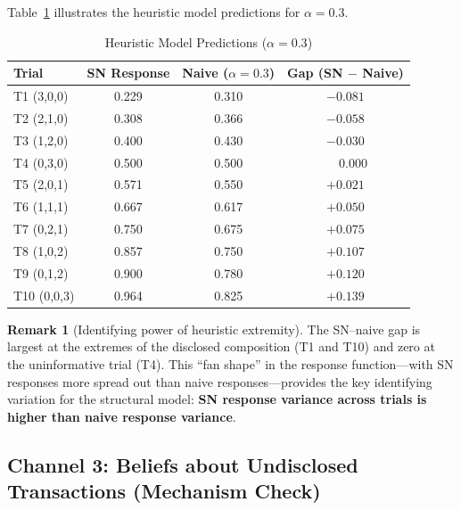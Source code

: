 \documentclass[12pt]{article}
\theoremstyle{definition}
\newtheorem{remark}{Remark}
\begin{document}
Table~\ref{tab:heuristic} illustrates the heuristic model predictions for $\alpha = 0.3$.

\begin{table}[h!]
\centering
\caption{Heuristic Model Predictions ($\alpha = 0.3$)}
\label{tab:heuristic}
\begin{tabular}{l cc c}
\toprule
Trial & SN Response & Naive ($\alpha = 0.3$) & Gap (SN $-$ Naive) \\
\midrule
T1 (3,0,0)   & 0.229 & 0.310 & $-0.081$ \\
T2 (2,1,0)   & 0.308 & 0.366 & $-0.058$ \\
T3 (1,2,0)   & 0.400 & 0.430 & $-0.030$ \\
T4 (0,3,0)   & 0.500 & 0.500 & $\phantom{-}0.000$ \\
T5 (2,0,1)   & 0.571 & 0.550 & $+0.021$ \\
T6 (1,1,1)   & 0.667 & 0.617 & $+0.050$ \\
T7 (0,2,1)   & 0.750 & 0.675 & $+0.075$ \\
T8 (1,0,2)   & 0.857 & 0.750 & $+0.107$ \\
T9 (0,1,2)   & 0.900 & 0.780 & $+0.120$ \\
T10 (0,0,3)  & 0.964 & 0.825 & $+0.139$ \\
\bottomrule
\end{tabular}
\end{table}

\begin{remark}[Identifying power of heuristic extremity]
The SN--naive gap is largest at the extremes of the disclosed composition (T1 and T10) and zero at the uninformative trial (T4). This ``fan shape'' in the response function---with SN responses more spread out than naive responses---provides the key identifying variation for the structural model: \textbf{SN response variance across trials is higher than naive response variance}.
\end{remark}

\subsection{Channel 3: Beliefs about Undisclosed Transactions (Mechanism Check)}
\end{document}
